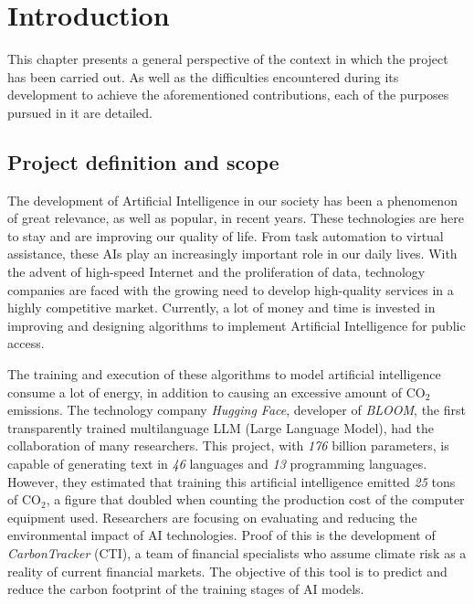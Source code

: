 \chapter*{Introduction}

This chapter presents a general perspective of the context in which the project has been carried out. As well as the difficulties encountered during its development to achieve the aforementioned contributions, each of the purposes pursued in it are detailed.


\section{Project definition and scope}

	The development of Artificial Intelligence in our society has been a phenomenon of great relevance, as well as popular, in recent years. These technologies are here to stay and are improving our quality of life. From task automation to virtual assistance\cite{lugano2017virtual}, these AIs play an increasingly important role in our daily lives. With the advent of high-speed Internet and the proliferation of data, technology companies are faced with the growing need to develop high-quality services in a highly competitive market. Currently, a lot of money and time is invested in improving and designing algorithms to implement Artificial Intelligence for public access\cite{thomas2021global}.
	
		
	The training and execution of these algorithms to model artificial intelligence consume a lot of energy, in addition to causing an excessive amount of CO\(_2\) emissions. The technology company \textit{Hugging Face}, developer of \textit{BLOOM}\cite{BloomAI}, the first transparently trained multilanguage LLM (Large Language Model), had the collaboration of many researchers. This project, with \textit{176} billion parameters, is capable of generating text in \textit{46} languages and \textit{13} programming languages. However, they estimated that training this artificial intelligence emitted \textit{25} tons of CO\(_2\), a figure that doubled when counting the production cost of the computer equipment used\cite{kirkpatrick2023carbon}. Researchers are focusing on evaluating and reducing the environmental impact of AI technologies. Proof of this is the development of \textit{CarbonTracker}\cite{jeppesen2021carbon} (CTI), a team of financial specialists who assume climate risk as a reality of current financial markets. The objective of this tool is to predict and reduce the carbon footprint of the training stages of AI\cite{mor2021artificial} models.
	
